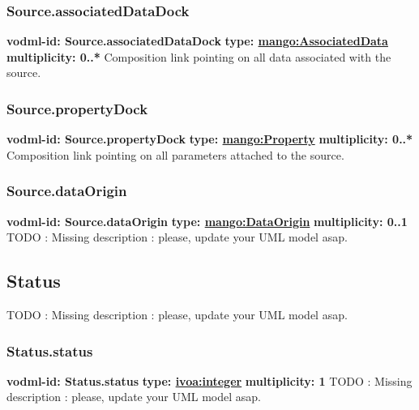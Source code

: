     \subsubsection{Source.associatedDataDock}
      \textbf{vodml-id: Source.associatedDataDock} \newline
      \textbf{type: \hyperref[sect:AssociatedData]{mango:AssociatedData}} \newline
      \textbf{multiplicity: 0..*} \newline
      Composition link pointing on all data associated with the source.

    \subsubsection{Source.propertyDock}
      \textbf{vodml-id: Source.propertyDock} \newline
      \textbf{type: \hyperref[sect:Property]{mango:Property}} \newline
      \textbf{multiplicity: 0..*} \newline
      Composition link pointing on all parameters attached to the source.

    \subsubsection{Source.dataOrigin}
      \textbf{vodml-id: Source.dataOrigin} \newline
      \textbf{type: \hyperref[sect:DataOrigin]{mango:DataOrigin}} \newline
      \textbf{multiplicity: 0..1} \newline
      TODO : Missing description : please, update your UML model asap.

  \subsection{Status}
  \label{sect:Status}
    TODO : Missing description : please, update your UML model asap.

    \subsubsection{Status.status}
      \textbf{vodml-id: Status.status} \newline
      \textbf{type: \hyperref[sect:ivoa]{ivoa:integer}} \newline
      \textbf{multiplicity: 1} \newline
      TODO : Missing description : please, update your UML model asap.

